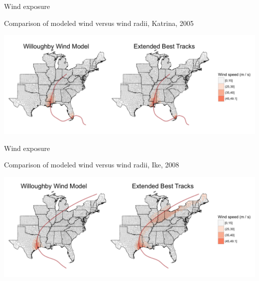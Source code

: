 \documentclass[ignorenonframetext,]{beamer}
\begin{document}
\begin{frame}{Wind exposure}

\begin{center}
Comparison of modeled wind versus wind radii, Katrina, 2005
\end{center}

\vspace{-1cm}

\begin{flushleft}\includegraphics[width=1.08\textwidth]{wind_model_eval_katrina_2005} \end{flushleft}

\end{frame}

\begin{frame}{Wind exposure}

\begin{center}
Comparison of modeled wind versus wind radii, Ike, 2008
\end{center}

\vspace{-1cm}

\begin{flushleft}\includegraphics[width=1.05\textwidth]{wind_model_eval_ike_2008} \end{flushleft}

\end{frame}
\end{document}
